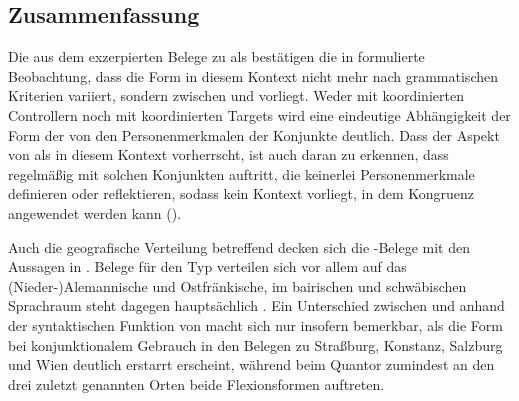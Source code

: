 
\subsection{Zusammenfassung}

Die aus dem \CAO{} exzerpierten Belege zu  als 
bestätigen die in \citet[626--627]{ksw2} formulierte Beobachtung, dass die Form
in diesem Kontext nicht mehr nach grammatischen Kriterien variiert, sondern
 zwischen  und  vorliegt. Weder
mit koordinierten Controllern noch mit koordinierten Targets
wird eine eindeutige Abhängigkeit der Form der  von den
Personenmerkmalen der Konjunkte deutlich. Dass der Aspekt von
 als  \autocites(siehe auch
)[425--428]{johannessen2005} in diesem Kontext
vorherrscht, ist auch daran zu erkennen, dass  regelmäßig mit
solchen Konjunkten auftritt, die keinerlei Personenmerkmale definieren oder
reflektieren, sodass kein Kontext vorliegt, in dem Kongruenz angewendet werden
kann ().

Auch die geografische Verteilung betreffend
decken sich die \CAO{}-Belege mit den Aussagen in \citet[627--628]{ksw2}.
Belege für den Typ  verteilen sich vor allem auf das
\mbox{(Nieder-)}\allowbreak{}Alemannische und
Ostfränkische, im bairischen und
schwäbischen Sprachraum steht dagegen
hauptsächlich . Ein Unterschied zwischen  und 
anhand der syntaktischen Funktion von  macht sich nur insofern
bemerkbar, als die Form bei konjunktionalem Gebrauch in den
Belegen zu Straßburg, Konstanz, Salzburg und Wien deutlich erstarrt erscheint,
während beim Quantor zumindest an den drei zuletzt genannten Orten beide
Flexionsformen auftreten.
